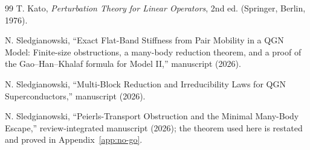 \documentclass[11pt]{article}
\theoremstyle{definition}
\theoremstyle{remark}
\begin{document}
\begin{thebibliography}{99}
T. Kato,
\emph{Perturbation Theory for Linear Operators}, 2nd ed.
(Springer, Berlin, 1976).

N. Sledgianowski,
``Exact Flat-Band Stiffness from Pair Mobility in a QGN Model: Finite-size obstructions, a many-body reduction theorem, and a proof of the Gao--Han--Khalaf formula for Model II,'' manuscript (2026).

N. Sledgianowski,
``Multi-Block Reduction and Irreducibility Laws for QGN Superconductors,'' manuscript (2026).

N. Sledgianowski,
``Peierls-Transport Obstruction and the Minimal Many-Body Escape,'' review-integrated manuscript (2026); the theorem used here is restated and proved in Appendix~\ref{app:no-go}.

\end{thebibliography}
\end{document}
